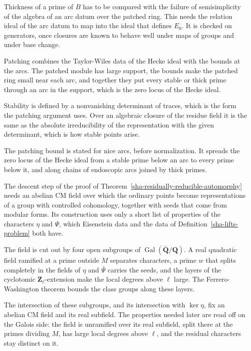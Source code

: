 Thickness of a prime of $B$ has to be compared with the failure of semisimplicity of the algebra of an arc datum over the patched ring. This needs the relation ideal of the arc datum to map into the ideal that defines $E_0$. It is checked on generators, once closures are known to behave well under maps of groups and under base change.

Patching combines the Taylor-Wiles data of the Hecke ideal with the bounds at the arcs. The patched module has large support, the bounds make the patched ring small near each arc, and together they put every stable or thick prime through an arc in the support, which is the zero locus of the Hecke ideal.

Stability is defined by a nonvanishing determinant of traces, which is the form the patching argument uses. Over an algebraic closure of the residue field it is the same as the absolute irreducibility of the representation with the given determinant, which is how stable points arise.

The patching bound is stated for nice arcs, before normalization. It spreads the zero locus of the Hecke ideal from a stable prime below an arc to every prime below it, and along chains of endoscopic arcs joined by thick primes.

The descent step of the proof of Theorem~\ref{sha-residually-reducible-automorphy} needs an abelian CM field over which the ordinary points become representations of a group with controlled cohomology, together with seeds that come from modular forms. Its construction uses only a short list of properties of the characters $\eta$ and $\Psi$, which Eisenstein data and the data of Definition~\ref{sha-lifts-problem} both have.

The field is cut out by four open subgroups of $\operatorname{Gal}(\bar{\mathbf Q}/\mathbf Q)$. A real quadratic field ramified at a prime outside $M$ separates characters, a prime $w$ that splits completely in the fields of $\eta$ and $\bar\Psi$ carries the seeds, and the layers of the cyclotomic $\mathbf Z_\ell$-extension make the local degrees above $\ell$ large. The Ferrero-Washington theorem bounds the class groups along these layers.

The intersection of these subgroups, and its intersection with $\ker\eta$, fix an abelian CM field and its real subfield. The properties needed later are read off on the Galois side: the field is unramified over its real subfield, split there at the primes dividing $M$, has large local degrees above $\ell$, and the residual characters stay distinct on it.

